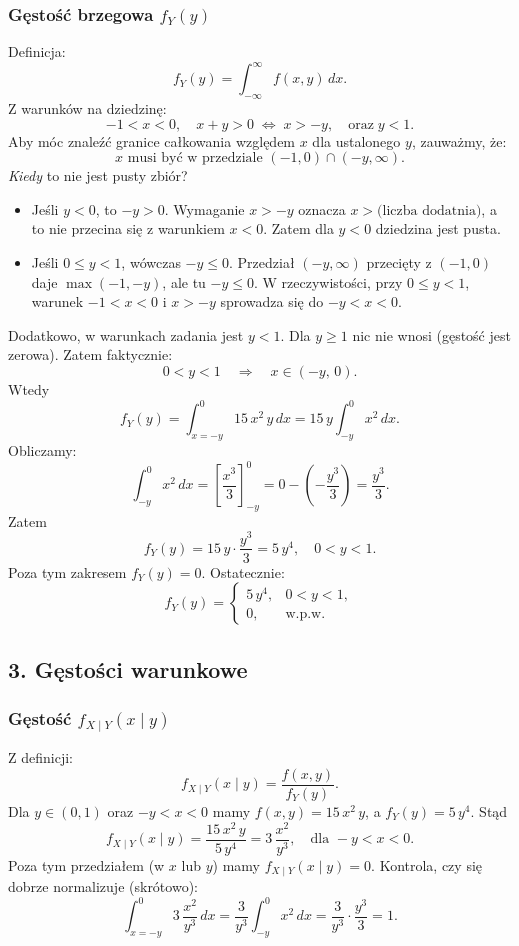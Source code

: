\documentclass[polish, 8pt]{article}
\begin{document}
\subsubsection*{Gęstość brzegowa \(f_Y(y)\)}
Definicja:
\[
f_Y(y) = \int_{-\infty}^{\infty} f(x,y)\,dx.
\]
Z warunków na dziedzinę:
\[
-1 < x < 0, \quad x + y > 0 \;\Longleftrightarrow\; x > -y,
\quad \text{oraz} \; y < 1.
\]
Aby móc znaleźć granice całkowania względem \(x\) dla ustalonego \(y\), zauważmy, że:
\[
x \text{ musi być w przedziale }(-1,0)\cap(-y,\infty).
\]
\emph{Kiedy} to nie jest pusty zbiór?
\begin{itemize}
\item Jeśli \(y < 0\), to \(-y > 0\). Wymaganie \(x > -y\) oznacza \(x> \text{(liczba dodatnia)}\), a to nie przecina się z warunkiem \(x<0\). Zatem dla \(y<0\) dziedzina jest pusta.
\item Jeśli \(0 \le y<1\), wówczas \(-y\le 0\). Przedział \((-y, \infty)\) przecięty z \((-1,0)\) daje \(\max(-1,-y)\), ale tu \(-y \le 0\). 
W rzeczywistości, przy \(0\le y<1\), warunek \(-1<x<0\) i \(x>-y\) sprowadza się do \(-y < x < 0\). 
\end{itemize}

Dodatkowo, w warunkach zadania jest \(y<1\). Dla \(y\ge 1\) nic nie wnosi (gęstość jest zerowa).  
Zatem faktycznie:
\[
0 < y < 1
\quad \Longrightarrow\quad
x \in (-y,\,0).
\]
Wtedy
\[
f_Y(y) 
= \int_{x=-y}^{0} 15\,x^2\,y \,dx 
= 15\,y \int_{-y}^{0} x^2\,dx.
\]
Obliczamy:
\[
\int_{-y}^{0} x^2\,dx 
= \left[\frac{x^3}{3}\right]_{-y}^{0}
= 0 - \left(-\frac{y^3}{3}\right)
= \frac{y^3}{3}.
\]
Zatem
\[
f_Y(y) = 15\,y \cdot \frac{y^3}{3}
= 5\,y^4,
\quad 0<y<1.
\]
Poza tym zakresem \(f_Y(y)=0\).  
Ostatecznie:
\[
\boxed{
f_Y(y) 
= \begin{cases}
5\,y^4, & 0<y<1, \\
0, & \text{w.p.w.}
\end{cases}
}
\]

\subsection*{3. Gęstości warunkowe}

\subsubsection*{Gęstość \(f_{X\mid Y}(x \mid y)\)}
Z definicji:
\[
f_{X\mid Y}(x \mid y) 
= \frac{f(x,y)}{f_Y(y)}.
\]
Dla \(y\in(0,1)\) oraz \(-y<x<0\) mamy \(f(x,y) = 15\,x^2\,y\), a \(f_Y(y)=5\,y^4\). Stąd
\[
f_{X\mid Y}(x\mid y)
= \frac{15\,x^2\,y}{5\,y^4}
= 3 \,\frac{x^2}{y^3},
\quad \text{dla } -y < x < 0.
\]
Poza tym przedziałem (w \(x\) lub \(y\)) mamy \(f_{X\mid Y}(x\mid y)=0\).  
Kontrola, czy się dobrze normalizuje (skrótowo):
\[
\int_{x=-y}^0 3\,\frac{x^2}{y^3}\,dx 
= \frac{3}{y^3} \int_{-y}^0 x^2\,dx 
= \frac{3}{y^3}\cdot \frac{y^3}{3} = 1.
\]
\end{document}
